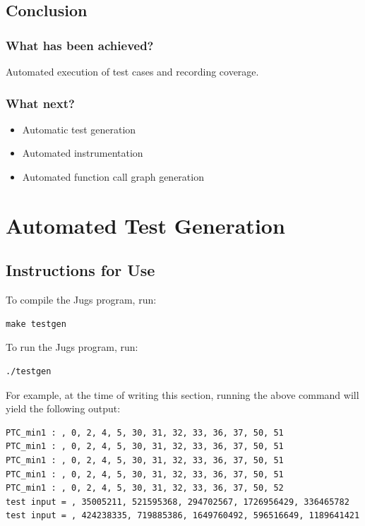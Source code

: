 \documentclass[12pts]{report}
\begin{document}
\section{Conclusion}
\subsection{What has been achieved?}
Automated execution of test cases and recording coverage.

\subsection{What next?}
\begin{itemize}
\item Automatic test generation
\item Automated instrumentation
\item Automated function call graph generation


\end{itemize}

\chapter{Automated Test Generation}

\section{Instructions for Use}
To compile the Jugs program, run:
\begin{lstlisting}[style=oc]
	make testgen
\end{lstlisting}

To run the Jugs program, run:
\begin{lstlisting}[style=oc]
	./testgen
\end{lstlisting}

For example, at the time of writing this section, running the above command will yield the following output:
\begin{lstlisting}[style=oc]
PTC_min1 : , 0, 2, 4, 5, 30, 31, 32, 33, 36, 37, 50, 51
PTC_min1 : , 0, 2, 4, 5, 30, 31, 32, 33, 36, 37, 50, 51
PTC_min1 : , 0, 2, 4, 5, 30, 31, 32, 33, 36, 37, 50, 51
PTC_min1 : , 0, 2, 4, 5, 30, 31, 32, 33, 36, 37, 50, 51
PTC_min1 : , 0, 2, 4, 5, 30, 31, 32, 33, 36, 37, 50, 52
test input = , 35005211, 521595368, 294702567, 1726956429, 336465782
test input = , 424238335, 719885386, 1649760492, 596516649, 1189641421
\end{lstlisting}
\end{document}
